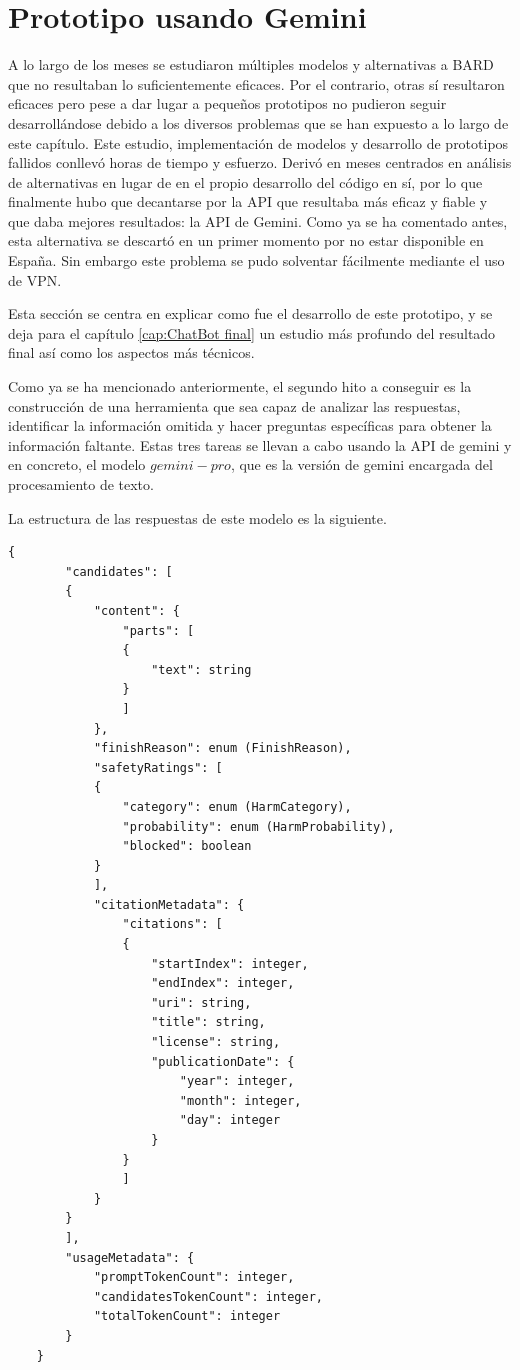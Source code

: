 \section{Prototipo usando Gemini}
\label{protogemini}
A lo largo de los meses se estudiaron múltiples modelos y alternativas a BARD que no resultaban lo suficientemente eficaces. Por el contrario, otras sí resultaron eficaces pero pese a dar lugar a pequeños prototipos no pudieron seguir desarrollándose debido a los diversos problemas que se han expuesto a lo largo de este capítulo. Este estudio, implementación de modelos y desarrollo de prototipos fallidos conllevó horas de tiempo y esfuerzo. Derivó en meses centrados en análisis de alternativas en lugar de en el propio desarrollo del código en sí, por lo que finalmente hubo que decantarse por la API que resultaba más eficaz y fiable y que daba mejores resultados: la API de Gemini. Como ya se ha comentado antes, esta alternativa se descartó en un primer momento por no estar disponible en España. Sin embargo este problema se pudo solventar fácilmente mediante el uso de VPN. 

Esta sección se centra en explicar como fue el desarrollo de este prototipo, y se deja para el capítulo \ref{cap:ChatBot final} un estudio más profundo del resultado final así como los aspectos más técnicos.

Como ya se ha mencionado anteriormente, el segundo hito a conseguir es la construcción de una herramienta que sea capaz de analizar las respuestas, identificar la información omitida y hacer preguntas específicas para obtener la información faltante. Estas tres tareas se llevan a cabo usando la API de gemini y en concreto, el modelo $gemini-pro$, que es la versión de gemini encargada del procesamiento de texto. 

La estructura de las respuestas de este modelo es la siguiente. 

\begin{lstlisting}[style=SpyderStyle, caption={Estructura de una respuesta de Gemini}, captionpos=b, label={lst:python},breaklines = true]
	{
		"candidates": [
		{
			"content": {
				"parts": [
				{
					"text": string
				}
				]
			},
			"finishReason": enum (FinishReason),
			"safetyRatings": [
			{
				"category": enum (HarmCategory),
				"probability": enum (HarmProbability),
				"blocked": boolean
			}
			],
			"citationMetadata": {
				"citations": [
				{
					"startIndex": integer,
					"endIndex": integer,
					"uri": string,
					"title": string,
					"license": string,
					"publicationDate": {
						"year": integer,
						"month": integer,
						"day": integer
					}
				}
				]
			}
		}
		],
		"usageMetadata": {
			"promptTokenCount": integer,
			"candidatesTokenCount": integer,
			"totalTokenCount": integer
		}
	}
\end{lstlisting}

